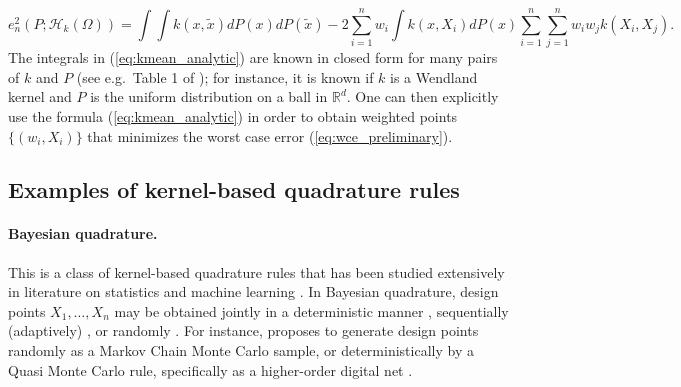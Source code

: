 \documentclass[11pt]{article}
\theoremstyle{remark}
\theoremstyle{example}
\theoremstyle{remark}
\newcommand{\tx}{\tilde{x}}
\renewcommand{\H}{{\mathcal{H}}}
\newcommand{\R}{\mathbb{R}}
\newcommand{\citep}{\cite}
\begin{document}
\begin{equation} \label{eq:kmean_analytic}
e^2_n(P;\H_k(\Omega))=\int \int k(x,\tx)dP(x)dP(\tx) - 2 \sum_{i=1}^n w_i \int k(x,X_i)dP(x) 
\sum_{i=1}^n \sum_{j=1}^n w_i w_j k(X_i,X_j).
\end{equation}
The integrals in (\ref{eq:kmean_analytic}) are known in closed form for many pairs of $k$ and $P$ (see e.g.\ Table 1 of \cite{BriOatGirOsbSej15}); for instance, it is known if $k$ is a Wendland kernel and $P$ is the uniform distribution on a ball in $\R^d$.
One can then explicitly use the formula (\ref{eq:kmean_analytic}) in order to obtain weighted points $\{ (w_i,X_i) \}$ that minimizes the worst case error (\ref{eq:wce_preliminary}).



\subsection{Examples of kernel-based quadrature rules}  \label{sec:rev_meth}

\paragraph{Bayesian quadrature.}
This is a class of kernel-based quadrature rules that has been studied extensively in literature on statistics and machine learning \citep{diaconis1988bayesian,Oha91,minka2000deriving,GhaZou03,osborne_active_2012,HusDuv12,gunter_sampling_2014,BriOatGirOsb15,BriOatGirOsbSej15,pmlr-v70-briol17a,SarHarSveSan16,Bac17,OatGirCho17}.
In Bayesian quadrature, design points $X_1,\dots,X_n$ may be obtained jointly in a deterministic manner \citep{diaconis1988bayesian,Oha91,minka2000deriving,BriOatGirOsbSej15,SarHarSveSan16}, sequentially (adaptively) \citep{osborne_active_2012,HusDuv12,gunter_sampling_2014,BriOatGirOsb15}, or randomly \citep{GhaZou03,BriOatGirOsbSej15,pmlr-v70-briol17a,Bac17,OatGirCho17}. 
For instance, \cite{BriOatGirOsbSej15} proposes to generate design points randomly as a Markov Chain Monte Carlo sample, or deterministically by a Quasi Monte Carlo rule, specifically as a higher-order digital net \citep{Dic08}.
\end{document}
